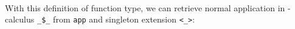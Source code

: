 \begin{code}
\AgdaSymbol{)}\AgdaSpace{}%
\AgdaSymbol{(}\AgdaSpace{}%
\AgdaSpace{}%
\AgdaSymbol{)}\<%
\\
%
\>[4]%
\>[8]\AgdaSymbol{:}\AgdaSpace{}%
\AgdaSpace{}%
\AgdaSpace{}%
\AgdaSpace{}%
\AgdaSpace{}%
\AgdaSpace{}%
\AgdaSpace{}%
\AgdaSymbol{\{}\AgdaSpace{}%
\AgdaSymbol{=}\AgdaSpace{}%
\AgdaSymbol{\}}\AgdaSpace{}%
\AgdaSpace{}%
\AgdaOperator{\AgdaInductiveConstructor{,}}\AgdaSpace{}%
\AgdaSpace{}%
\<%
\\
%
\>[4]\AgdaSpace{}%
\AgdaSymbol{:}\AgdaSpace{}%
\AgdaSpace{}%
\AgdaSpace{}%
\AgdaOperator{\AgdaInductiveConstructor{[}}\AgdaSpace{}%
\AgdaSpace{}%
\AgdaOperator{\AgdaInductiveConstructor{]}}\AgdaSpace{}%
\AgdaSpace{}%
\AgdaSpace{}%
\AgdaSymbol{(}\AgdaSpace{}%
\AgdaOperator{\AgdaInductiveConstructor{[}}\AgdaSpace{}%
\AgdaSpace{}%
\AgdaSpace{}%
\AgdaOperator{\AgdaInductiveConstructor{]}}\AgdaSymbol{)}\<%
\\
%
\>[4]\AgdaSpace{}%
\AgdaSymbol{:}\AgdaSpace{}%
\AgdaSpace{}%
\AgdaSymbol{(}\AgdaSpace{}%
\AgdaOperator{\AgdaInductiveConstructor{[}}\AgdaSpace{}%
\AgdaSpace{}%
\AgdaOperator{\AgdaInductiveConstructor{]}}\AgdaSymbol{)}\AgdaSpace{}%
\AgdaSpace{}%
\AgdaSpace{}%
\AgdaSpace{}%
\AgdaOperator{\AgdaInductiveConstructor{[}}\AgdaSpace{}%
\AgdaSpace{}%
\AgdaSpace{}%
\AgdaOperator{\AgdaInductiveConstructor{]}}\<%
\end{code}

With this definition of function type, we can retrieve normal application in \lambda-calculus \texttt{\_\$\_} from \texttt{app} and singleton extension \texttt{<\_>}:

